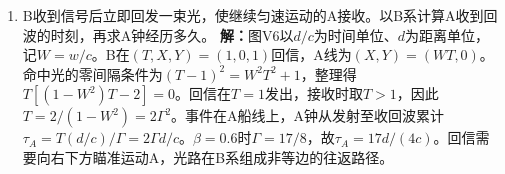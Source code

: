 \documentclass[UTF8,fontset=fandol,a4paper,11pt]{ctexart}
\begin{document}
\begin{enumerate}
\item B收到信号后立即回发一束光，使继续匀速运动的A接收。以B系计算A收到回波的时刻，再求A钟经历多久。
\textbf{解：}图V6以$d/c$为时间单位、$d$为距离单位，记$W=w/c$。B在$(T,X,Y)=(1,0,1)$回信，A线为$(X,Y)=(WT,0)$。命中光的零间隔条件为$(T-1)^2=W^2T^2+1$，整理得$T[(1-W^2)T-2]=0$。回信在$T=1$发出，接收时取$T>1$，因此$T=2/(1-W^2)=2\Gamma^2$。事件在A船线上，A钟从发射至收回波累计$\tau_A=T(d/c)/\Gamma=2\Gamma d/c$。$\beta=0.6$时$\Gamma=17/8$，故$\tau_A=17d/(4c)$。回信需要向右下方瞄准运动A，光路在B系组成非等边的往返路径。
\begin{center}\begin{minipage}{.98\linewidth}\centering
{}
\end{minipage}
\end{center}
\end{enumerate}
\end{document}
